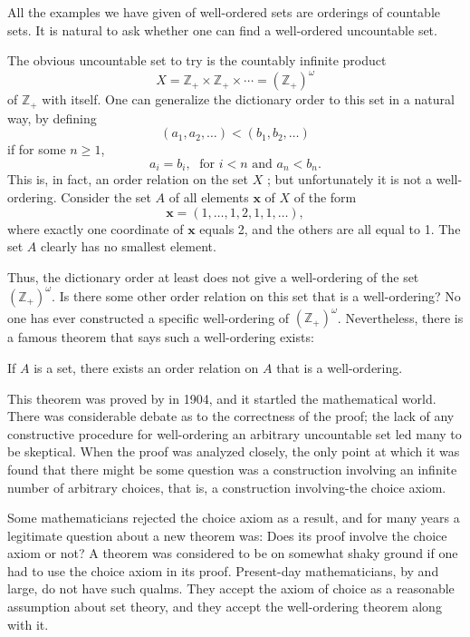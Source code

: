 All the examples we have given of well-ordered sets are orderings of countable sets. 
It is natural to ask whether one can find a well-ordered uncountable set.

The obvious uncountable set to try is the countably infinite product
\[
X = \mathbb{Z}_{+} \times {\mathbb{Z}}_{+} \times \cdots = {(\mathbb{Z}_{+}) }^{\omega }
\]
of \(\mathbb{Z}_{+}\) with itself. One can generalize the dictionary order to 
this set in a natural way, by defining
\[
({a_{1},a_{2},\ldots }) < ({b_{1},b_{2},\ldots })
\]
if for some \(n \geq 1\),
\[
a_{i} = b_{i},\;\text{ for }i < n\text{ and }a_{n} < b_{n}.
\]
This is, in fact, an order relation on the set \(X\) ; but unfortunately it is not a 
well-ordering. Consider the set \(A\) of all elements \(\mathbf{x}\) of \(X\) of the form
\[
\mathbf{x} = ({1,\ldots, 1,2,1,1,\ldots }),
\]
where exactly one coordinate of \(\mathbf{x}\) equals 2, and the others are all equal to 
1. The set \(A\) clearly has no smallest element.

Thus, the dictionary order at least does not give a well-ordering of the set 
\({(\mathbb{Z}_{+}) }^{\omega }\). Is there some other order relation on this set 
that is a well-ordering? No one has ever constructed a specific well-ordering of 
\({(\mathbb{Z}_{+}) }^{\omega }\). Nevertheless, there is a famous theorem that 
says such a well-ordering exists:

\begin{utheorem}
\label{thm:wellordering}
 If \(A\) is a set, there exists an order relation on \(A\) that is a well-ordering.
\end{utheorem}

This theorem was proved by  in 1904, and it startled the mathematical world. 
There was considerable debate as to the correctness of the proof; the lack of 
any constructive procedure for well-ordering an arbitrary uncountable set led many 
to be skeptical. When the proof was analyzed closely, the only point at which 
it was found that there might be some question was a construction involving an 
infinite number of arbitrary choices, that is, a construction involving-the choice axiom.

Some mathematicians rejected the choice axiom as a result, and for many years 
a legitimate question about a new theorem was: Does its proof involve the choice axiom 
or not? A theorem was considered to be on somewhat shaky ground if one had to use 
the choice axiom in its proof. Present-day mathematicians, by and large, do not have 
such qualms. They accept the axiom of choice as a reasonable assumption about set theory, 
and they accept the well-ordering theorem along with it.

